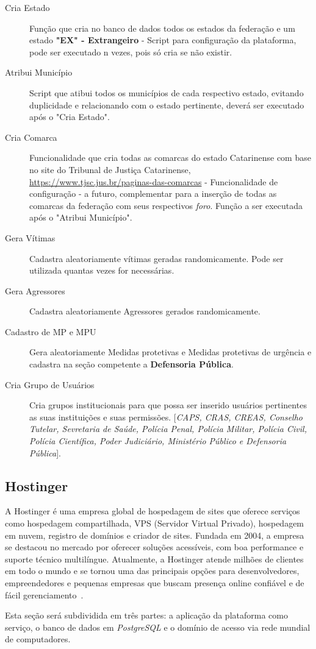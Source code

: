 \begin{description}
   \item [Cria Estado] Função que cria no banco de dados todos os estados da federação e um estado \textbf{"EX" - Extrangeiro} - Script para configuração da plataforma, pode ser executado n vezes, pois só cria se não existir.
   \item [Atribui Município] Script que atibui todos os municípios de cada respectivo estado, evitando duplicidade e relacionando com o estado pertinente, deverá ser executado após o "Cria Estado".
   \item [Cria Comarca] Funcionalidade que cria todas as comarcas do estado Catarinense com base no site do Tribunal de Justiça Catarinense, \href{https://www.tjsc.jus.br/paginas-das-comarcas}{https://www.tjsc.jus.br/paginas-das-comarcas} - Funcionalidade de configuração - a futuro, complementar para a inserção de todas as comarcas da federação com seus respectivos \textit{foro}. Função a ser executada após o "Atribui Município".
   \item [Gera Vítimas] Cadastra aleatoriamente vítimas geradas randomicamente. Pode ser utilizada quantas vezes for necessárias.
   \item [Gera Agressores] Cadastra aleatoriamente Agressores gerados randomicamente.
   \item [Cadastro de MP e MPU] Gera aleatoriamente Medidas protetivas e Medidas protetivas de urgência e cadastra na seção competente a \textbf{Defensoria Pública}.
   \item [Cria Grupo de Usuários] Cria grupos institucionais para que possa ser inserido usuários pertinentes as suas instituições e suas permissões. [\textit{CAPS, CRAS, CREAS, Conselho Tutelar, Sevretaria de Saúde, Polícia Penal, Polícia Militar, Polícia Civil, Polícia Científica, Poder Judiciário, Ministério Público e Defensoria Pública}].
 \end{description}



\subsection{Hostinger}
\par A Hostinger é uma empresa global de hospedagem de sites que oferece serviços como hospedagem compartilhada, VPS (Servidor Virtual Privado), hospedagem em nuvem, registro de domínios e criador de sites. Fundada em 2004, a empresa se destacou no mercado por oferecer soluções acessíveis, com boa performance e suporte técnico multilíngue. Atualmente, a Hostinger atende milhões de clientes em todo o mundo e se tornou uma das principais opções para desenvolvedores, empreendedores e pequenas empresas que buscam presença online confiável e de fácil gerenciamento~\cite{hostinger2025}.
\par Esta seção será subdividida em três partes: a aplicação da plataforma como serviço, o banco de dados em \textit{PostgreSQL} e o domínio de acesso via rede mundial de computadores.


